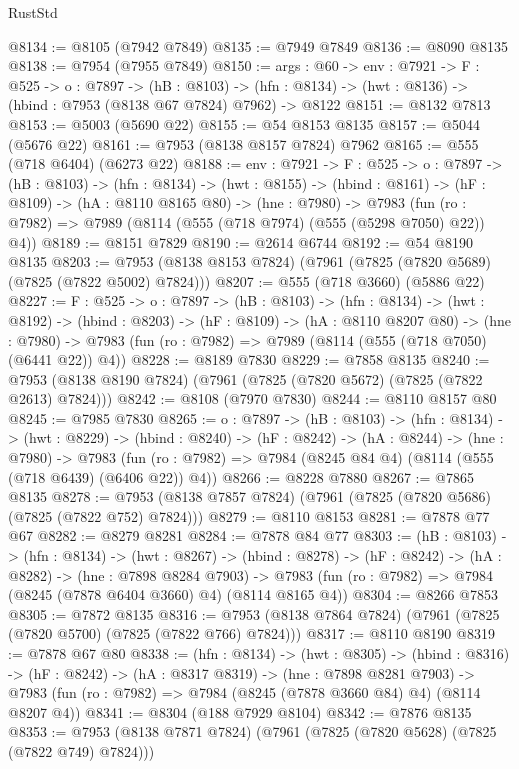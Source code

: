 \begin{lexlean}{RustStd}
\begin{coremodule}
@8134 := @8105 (@7942 @7849)
@8135 := @7949 @7849
@8136 := @8090 @8135
@8138 := @7954 (@7955 @7849)
@8150 := {args : @60} ->
  {env : @7921} ->
  {F : @525} ->
  {o : @7897} ->
  (hB : @8103) -> (hfn : @8134) -> (hwt : @8136) -> (hbind : @7953 (@8138 @67 @7824) @7962) -> @8122
@8151 := @8132 @7813
@8153 := @5003 (@5690 @22)
@8155 := @54 @8153 @8135
@8157 := @5044 (@5676 @22)
@8161 := @7953 (@8138 @8157 @7824) @7962
@8165 := @555 (@718 @6404) (@6273 @22)
@8188 := {env : @7921} ->
  {F : @525} ->
  {o : @7897} ->
  (hB : @8103) ->
  (hfn : @8134) ->
  (hwt : @8155) ->
  (hbind : @8161) ->
  (hF : @8109) ->
  (hA : @8110 @8165 @80) ->
  (hne : @7980) ->
  @7983 (fun (ro : @7982) => @7989 (@8114 (@555 (@718 @7974) (@555 (@5298 @7050) @22)) @4))
@8189 := @8151 @7829
@8190 := @2614 @6744
@8192 := @54 @8190 @8135
@8203 := @7953 (@8138 @8153 @7824) (@7961 (@7825 (@7820 @5689) (@7825 (@7822 @5002) @7824)))
@8207 := @555 (@718 @3660) (@5886 @22)
@8227 := {F : @525} ->
  {o : @7897} ->
  (hB : @8103) ->
  (hfn : @8134) ->
  (hwt : @8192) ->
  (hbind : @8203) ->
  (hF : @8109) ->
  (hA : @8110 @8207 @80) ->
  (hne : @7980) -> @7983 (fun (ro : @7982) => @7989 (@8114 (@555 (@718 @7050) (@6441 @22)) @4))
@8228 := @8189 @7830
@8229 := @7858 @8135
@8240 := @7953 (@8138 @8190 @7824) (@7961 (@7825 (@7820 @5672) (@7825 (@7822 @2613) @7824)))
@8242 := @8108 (@7970 @7830)
@8244 := @8110 @8157 @80
@8245 := @7985 @7830
@8265 := {o : @7897} ->
  (hB : @8103) ->
  (hfn : @8134) ->
  (hwt : @8229) ->
  (hbind : @8240) ->
  (hF : @8242) ->
  (hA : @8244) ->
  (hne : @7980) ->
  @7983 (fun (ro : @7982) => @7984 (@8245 @84 @4) (@8114 (@555 (@718 @6439) (@6406 @22)) @4))
@8266 := @8228 @7880
@8267 := @7865 @8135
@8278 := @7953 (@8138 @7857 @7824) (@7961 (@7825 (@7820 @5686) (@7825 (@7822 @752) @7824)))
@8279 := @8110 @8153
@8281 := @7878 @77 @67
@8282 := @8279 @8281
@8284 := @7878 @84 @77
@8303 := (hB : @8103) ->
  (hfn : @8134) ->
  (hwt : @8267) ->
  (hbind : @8278) ->
  (hF : @8242) ->
  (hA : @8282) ->
  (hne : @7898 @8284 @7903) ->
  @7983 (fun (ro : @7982) => @7984 (@8245 (@7878 @6404 @3660) @4) (@8114 @8165 @4))
@8304 := @8266 @7853
@8305 := @7872 @8135
@8316 := @7953 (@8138 @7864 @7824) (@7961 (@7825 (@7820 @5700) (@7825 (@7822 @766) @7824)))
@8317 := @8110 @8190
@8319 := @7878 @67 @80
@8338 := (hfn : @8134) ->
  (hwt : @8305) ->
  (hbind : @8316) ->
  (hF : @8242) ->
  (hA : @8317 @8319) ->
  (hne : @7898 @8281 @7903) ->
  @7983 (fun (ro : @7982) => @7984 (@8245 (@7878 @3660 @84) @4) (@8114 @8207 @4))
@8341 := @8304 (@188 @7929 @8104)
@8342 := @7876 @8135
@8353 := @7953 (@8138 @7871 @7824) (@7961 (@7825 (@7820 @5628) (@7825 (@7822 @749) @7824)))

\end{coremodule}
\end{lexlean}
